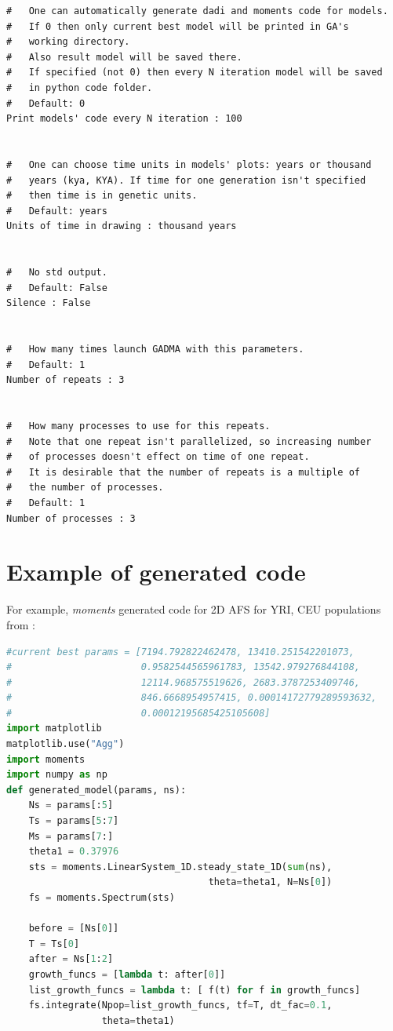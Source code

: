 \documentclass[12pt]{article}
\newcommand{\moments}{\textit{moments}\xspace}
\begin{document}
\begin{appendices}
\begin{lstlisting}
#   One can automatically generate dadi and moments code for models.
#   If 0 then only current best model will be printed in GA's 
#   working directory.
#   Also result model will be saved there. 
#   If specified (not 0) then every N iteration model will be saved
#   in python code folder.
#   Default: 0
Print models' code every N iteration : 100


#   One can choose time units in models' plots: years or thousand 
#   years (kya, KYA). If time for one generation isn't specified 
#   then time is in genetic units.
#   Default: years
Units of time in drawing : thousand years


#   No std output.
#   Default: False
Silence : False


#   How many times launch GADMA with this parameters.
#   Default: 1
Number of repeats : 3


#   How many processes to use for this repeats.
#   Note that one repeat isn't parallelized, so increasing number
#   of processes doesn't effect on time of one repeat.
#   It is desirable that the number of repeats is a multiple of 
#   the number of processes.
#   Default: 1
Number of processes : 3
\end{lstlisting}

\newpage
\section{Example of generated code}
\label{sec:ex-gen-code}
For example, \moments generated code for 2D AFS for YRI, CEU populations from \cite{gutenkunst2009}:

\begin{lstlisting}[language=Python]
#current best params = [7194.792822462478, 13410.251542201073, 
#                       0.9582544565961783, 13542.979276844108, 
#                       12114.968575519626, 2683.3787253409746, 
#                       846.6668954957415, 0.00014172779289593632, 
#                       0.00012195685425105608]
import matplotlib
matplotlib.use("Agg")
import moments
import numpy as np
def generated_model(params, ns):
	Ns = params[:5]
	Ts = params[5:7]
	Ms = params[7:]
	theta1 = 0.37976
	sts = moments.LinearSystem_1D.steady_state_1D(sum(ns), 
	                                theta=theta1, N=Ns[0])
	fs = moments.Spectrum(sts)

	before = [Ns[0]]
	T = Ts[0]
	after = Ns[1:2]
	growth_funcs = [lambda t: after[0]]
	list_growth_funcs = lambda t: [ f(t) for f in growth_funcs]
	fs.integrate(Npop=list_growth_funcs, tf=T, dt_fac=0.1, 
	             theta=theta1)


\end{lstlisting}
\end{appendices}
\end{document}
